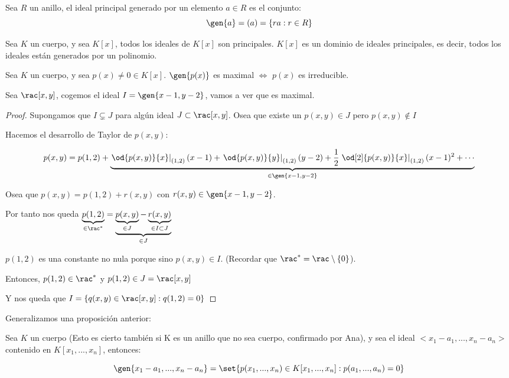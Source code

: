 \begin{example}
	Sea $R$ un anillo, el ideal principal generado por un elemento $a \in R$ es el conjunto:
	$$ \gen{a}=(a)=\{ra: r \in R \} $$
\end{example}

\begin{prop}
	Sea $K$ un cuerpo, y sea $K[x]$, todos los ideales de $K[x]$ son principales. $K[x]$ es un dominio de ideales principales, es decir, todos los ideales están generados por un polinomio.
\end{prop}

\begin{prop}
Sea $K$ un cuerpo, y sea $p(x)\neq 0 \in K[x]$. $\gen{p(x)}$ es maximal $\Leftrightarrow$ $p(x)$ es irreducible.
\end{prop}

\begin{example}
Sea $\rac[x,y]$, cogemos el ideal $I=\gen{x-1,y-2}$, vamos a ver que es maximal.

\begin{proof}
	Supongamos que $I \subsetneq J$ para algún ideal $J \subset \rac[x,y]$. Osea que existe un $p(x,y) \in J$ pero $p(x,y) \notin I$

	Hacemos el desarrollo de Taylor de $p(x,y)$:

	$$ p(x,y)=p(1,2) + \underbrace{\left.\od{p(x,y)}{x}\right|_{(1,2)} (x-1)+ \left.\od{p(x,y)}{y}\right|_{(1,2)} (y-2)+\frac{1}{2}\left.\od[2]{p(x,y)}{x}\right|_{(1,2)} (x-1)^2+ \dotsb }_{\in \gen{x-1,y-2}}$$

	Osea que $p(x,y)=p(1,2)+r(x,y)$ con $r(x,y) \in \gen{x-1,y-2}$.

	Por tanto nos queda $\underbrace{p(1,2)}_{\in \rac^*}=\underbrace{\underbrace{p(x,y)}_{\in J}-\underbrace{r(x,y)}_{\in I \subset J}}_{\in J}$

	$p(1,2)$ es una constante no nula porque sino $p(x,y) \in I$. (Recordar que $\rac^*=\rac\setminus\{0\}$).

	Entonces, $p(1,2) \in \rac^*$ y $p(1,2) \in J =\rac[x,y]$

	Y nos queda que $I=\{ q(x,y) \in \rac[x,y]: q(1,2)=0 \}$
\end{proof}
\end{example}

Generalizamos una proposición anterior:
\begin{prop}
	Sea $K$ un cuerpo (Esto es cierto también si K es un anillo que no sea cuerpo, confirmado por Ana), y sea el ideal $<x_1-a_1,...,x_n-a_n>$ contenido en $K[x_1,...,x_n]$, entonces:

	$$\gen{x_1-a_1,...,x_n-a_n}=\set{p(x_1,...,x_n)\in K[x_1,...,x_n]:p(a_1,...,a_n)=0 }$$
\end{prop}

